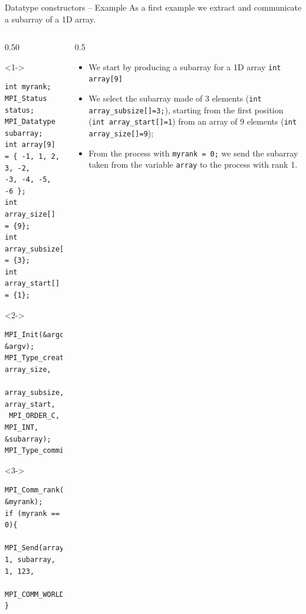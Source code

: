 \documentclass[xcolor={svgnames,usenames}]{beamer}
\begin{document}
\begin{frame}[fragile]{Datatype constructors -- Example}
As a first example we extract and communicate a subarray of a 1D array.
\begin{columns}
	\begin{column}{0.50\textwidth}
\footnotesize
\begin{onlyenv}<1->
\begin{verbatim}
int myrank;
MPI_Status status;
MPI_Datatype subarray;
int array[9] = { -1, 1, 2, 3, -2, 
-3, -4, -5, -6 };
int array_size[] = {9};
int array_subsize[] = {3};
int array_start[] = {1};
\end{verbatim}
\end{onlyenv}
\begin{onlyenv}<2->
\begin{verbatim}
MPI_Init(&argc, &argv);
MPI_Type_create_subarray(1, array_size, 
 array_subsize, array_start, 
 MPI_ORDER_C, MPI_INT, &subarray);
MPI_Type_commit(&subarray);
\end{verbatim}
\end{onlyenv}
\begin{onlyenv}<3->
\begin{verbatim}
MPI_Comm_rank(MPI_COMM_WORLD, &myrank);
if (myrank == 0){
 MPI_Send(array, 1, subarray, 1, 123, 
  MPI_COMM_WORLD);
}
\end{verbatim}
\end{onlyenv}
\end{column}
\begin{column}{0.5\textwidth}
\begin{itemize}
\item<1-> We start by producing a subarray for a 1D array \texttt{int array[9]}
\item<2-> We select the subarray made of 3 elements (\texttt{int array_subsize[]={3};}), starting from the first position (\texttt{int array_start[]={1}}) from an array of 9 elements (\texttt{int array_size[]={9}});
\item<3-> From the process with \texttt{myrank = 0;} we send the subarray taken from the variable \texttt{array} to the process with rank 1.
\end{itemize}
\end{column}
\end{columns}
\end{frame}
\end{document}
